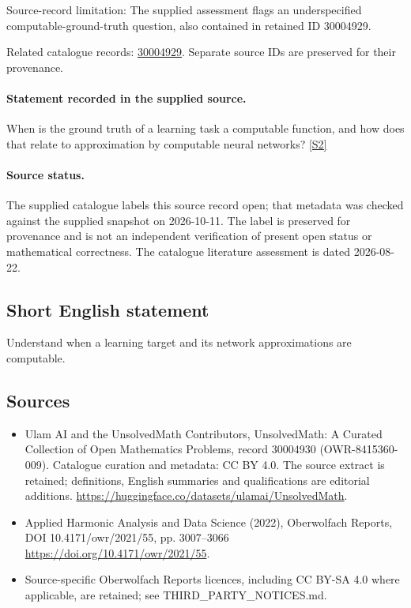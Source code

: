 \documentclass[11pt]{article}
\begin{document}
Source-record limitation: The supplied assessment flags an underspecified computable-ground-truth question, also contained in retained ID 30004929.

Related catalogue records: \href{https://mehmetmars7.github.io/Erdosproblems-llm-hunter/problem.html?type=open_problems&id=30004929}{30004929}. Separate source IDs are preserved for their provenance.
\paragraph{Statement recorded in the supplied source.}
When is the ground truth of a learning task a computable function, and how does that relate to approximation by computable neural networks? \href{https://doi.org/10.4171/owr/2021/55}{[S2]}
\paragraph{Source status.}
The supplied catalogue labels this source record open; that metadata was checked against the supplied snapshot on 2026-10-11. The label is preserved for provenance and is not an independent verification of present open status or mathematical correctness. The catalogue literature assessment is dated 2026-08-22.
\subsection{Short English statement}
Understand when a learning target and its network approximations are computable.
\subsection{Sources}
\begin{itemize}
\item[S1] Ulam AI and the UnsolvedMath Contributors, UnsolvedMath: A Curated Collection of Open Mathematics Problems, record 30004930 (OWR-8415360-009). Catalogue curation and metadata: CC BY 4.0. The source extract is retained; definitions, English summaries and qualifications are editorial additions.
\url{https://huggingface.co/datasets/ulamai/UnsolvedMath}.
\item[S2] Applied Harmonic Analysis and Data Science (2022), Oberwolfach Reports, DOI 10.4171/owr/2021/55, pp. 3007--3066
\url{https://doi.org/10.4171/owr/2021/55}.
\item Source-specific Oberwolfach Reports licences, including CC BY-SA 4.0 where applicable, are retained; see THIRD\_PARTY\_NOTICES.md.
\end{itemize}
\end{document}
